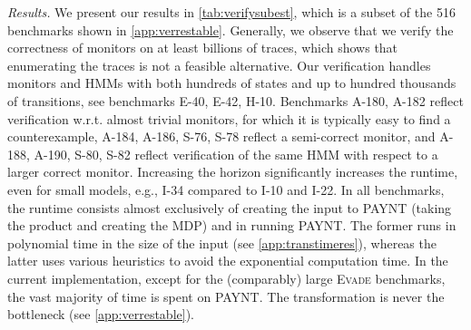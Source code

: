 \documentclass[runningheads]{llncs}
\newcommand{\appcite}[2]{#2} %
\renewcommand{\paragraph}[1]{\smallskip\noindent\emph{#1}}
\begin{document}
\begin{table}[t]
    \vspace{.2cm}
    \caption{Subset of verification results found in \appcite{\cite[App. C.2]{TR}}{\cref{app:verrestable}}. The columns give the family name, an ID, horizon, and whether we check for missed alarms or false alarms. We give the size of the HMM (states, transitions), the number of observations, the size of the DFA (states, transitions), and the size of the language after pruning unreachable states. Furthermore, we list the run time for the complete verification procedure as well as the time spent on transforming the problem into a policy synthesis problem and the policy synthesis in PAYNT. Lastly, we list the size of the colored MDP produced by the transformation and the risk of the found counterexample. If no trace was found with a risk above (or below, for FA) the indicated threshold, the monitor is correct (\checkmark).}
    \label{tab:verifysubest}
    \vspace{-.5cm}
\end{table}

\paragraph{Results.}
We present our results in \cref{tab:verifysubest}, which is a subset of the 516 benchmarks shown in \appcite{\cite[App. C.2]{TR}}{\cref{app:verrestable}}. Generally, we observe that we verify the correctness of monitors on at least billions of traces, which shows that enumerating the traces is not a feasible alternative. Our verification handles monitors and HMMs with both hundreds of states and up to hundred thousands of transitions, see benchmarks \textsc{E-40}, \textsc{E-42}, \textsc{H-10}.
Benchmarks \textsc{A-180}, \textsc{A-182} reflect verification w.r.t. almost trivial monitors, for which it is typically easy to find a counterexample, \textsc{A-184}, \textsc{A-186}, \textsc{S-76}, \textsc{S-78} reflect a semi-correct monitor, and \textsc{A-188}, \textsc{A-190}, \textsc{S-80}, \textsc{S-82} reflect verification of the same HMM with respect to a larger correct monitor.
Increasing the horizon significantly increases the runtime, even for small models, e.g., \textsc{I-34} compared to \textsc{I-10} and \textsc{I-22}.
In all benchmarks, the runtime consists almost exclusively of creating the input to PAYNT (taking the product and creating the MDP) and in running PAYNT. The former runs in polynomial time in the size of the input (see \appcite{\cite[App. C.1]{TR}}{\cref{app:transtimeres}}), whereas the latter uses various heuristics to avoid the exponential computation time. In the current implementation, except for the (comparably) large \textsc{Evade} benchmarks, the vast majority of time is spent on PAYNT. The transformation is never the bottleneck (see \appcite{\cite[App. C.2]{TR}}{\cref{app:verrestable}}).
\end{document}

